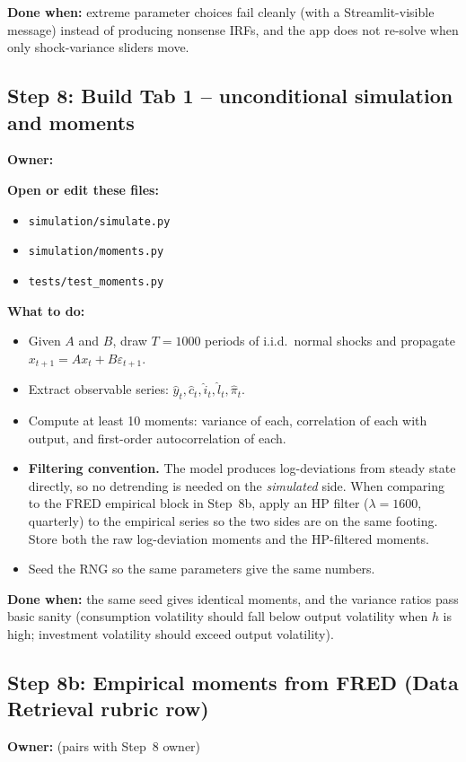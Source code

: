 \documentclass[11pt]{article}
\newcommand{\nameblank}{\underline{\hspace{4.5cm}}}
\begin{document}
\textbf{Done when:} extreme parameter choices fail cleanly (with a Streamlit-visible message) instead of producing nonsense IRFs, and the app does not re-solve when only shock-variance sliders move.

\subsection{Step 8: Build Tab 1 -- unconditional simulation and moments}
\textbf{Owner:} \nameblank

\textbf{Open or edit these files:}
\begin{itemize}
    \item \texttt{simulation/simulate.py}
    \item \texttt{simulation/moments.py}
    \item \texttt{tests/test\_moments.py}
\end{itemize}

\textbf{What to do:}
\begin{itemize}
    \item Given $A$ and $B$, draw $T=1000$ periods of i.i.d.\ normal shocks and propagate $x_{t+1} = A x_t + B \varepsilon_{t+1}$.
    \item Extract observable series: $\hat{y}_t, \hat{c}_t, \hat{i}_t, \hat{l}_t, \hat{\pi}_t$.
    \item Compute at least 10 moments: variance of each, correlation of each with output, and first-order autocorrelation of each.
    \item \textbf{Filtering convention.} The model produces log-deviations from steady state directly, so no detrending is needed on the \emph{simulated} side. When comparing to the FRED empirical block in Step~8b, apply an HP filter ($\lambda=1600$, quarterly) to the empirical series so the two sides are on the same footing. Store both the raw log-deviation moments and the HP-filtered moments.
    \item Seed the RNG so the same parameters give the same numbers.
\end{itemize}

\textbf{Done when:} the same seed gives identical moments, and the variance ratios pass basic sanity (consumption volatility should fall below output volatility when $h$ is high; investment volatility should exceed output volatility).

\subsection{Step 8b: Empirical moments from FRED (Data Retrieval rubric row)}
\textbf{Owner:} \nameblank{} (pairs with Step~8 owner)
\end{document}
